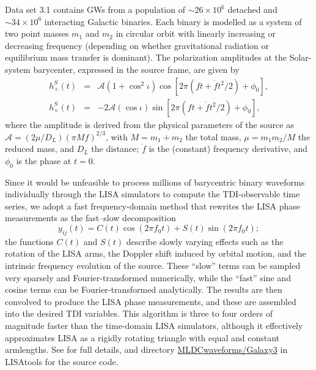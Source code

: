 \documentclass{iopart}
\begin{document}
Data set 3.1 contains GWs from a population of $\sim 26 \times 10^6$ detached and $\sim 34 \times 10^6$ interacting Galactic binaries. Each binary is modelled as a system of two point masses $m_1$ and $m_2$ in circular orbit with linearly increasing or decreasing frequency (depending on whether gravitational radiation or equilibrium mass transfer is dominant). The polarization amplitudes at the Solar-system barycenter, expressed in the source frame, are given by
%
\begin{eqnarray}
h^S_+(t) & = & \mathcal{A} \left(1 + \cos^2{\iota}\right) \cos[2\pi (f t + \dot{f} t^2 / 2) + \phi_0], \\
h^S_\times(t) & = & -2 \mathcal{A} (\cos{\iota}) \sin[2\pi (f t + \dot{f} t^2 / 2) + \phi_0], \nonumber
\end{eqnarray}
%
where the amplitude is derived from the physical parameters of the source as $\mathcal{A} = (2 \mu / D_L) (\pi M f)^{2/3}$, with $M = m_1 + m_2$ the total mass, $\mu = m_1 m_2 / M $ the reduced mass, and $D_L$ the distance; $\dot{f}$ is the (constant) frequency derivative, and $\phi_0$ is the phase at $t = 0$.

Since it would be unfeasible to process millions of barycentric binary waveforms individually through the LISA simulators to compute the TDI-observable time series, we adopt a fast frequency-domain method \cite{Cornish:2007if} that rewrites the LISA phase measurements as the fast--slow decomposition
%
\begin{equation}
y_{ij}(t) = C(t) \cos(2 \pi f_0 t) + S(t) \sin(2 \pi f_0 t) ;
\end{equation}
%
the functions $C(t)$ and $S(t)$ describe slowly varying effects such as the rotation of the LISA arms, the Doppler shift induced by orbital motion, and the intrinsic frequency evolution of the source. These ``slow'' terms can be sampled very sparsely and Fourier-transformed numerically, while the ``fast'' sine and cosine terms can be Fourier-transformed analytically. The results are then convolved to produce the LISA phase measurements, and these are assembled into the desired TDI variables. This algorithm is three to four orders of magnitude faster than the time-domain LISA simulators, although it effectively approximates LISA as a rigidly rotating triangle with equal and constant armlengths. See \cite{Cornish:2007if} for full details, and directory \url{MLDCwaveforms/Galaxy3} in LISAtools for the source code.
\end{document}

